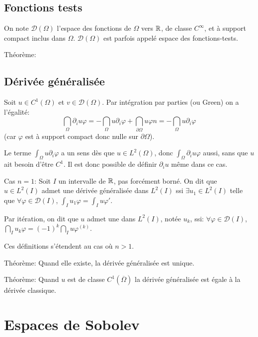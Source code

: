 \medskip
\subsection*{Fonctions tests}

On note $\mathcal{D}(\Omega)$ l'espace des fonctions de $\Omega$ vers $\mathbb R$, de
classe $C^\infty$, et à support compact inclus dans $\Omega$.
$\mathcal{D}(\Omega)$ est parfois appelé espace des fonctions-tests.

Théorème: 

\medskip
\subsection*{Dérivée généralisée}

Soit $u\in C^1(\Omega)$ et $v\in\mathcal{D}(\Omega)$. 
Par intégration par parties (ou Green) on a l'égalité:
\[
\dint_\Omega \partial_iu \varphi = -\dint_\Omega u \partial_i\varphi
+\dint_{\partial\Omega} u\varphi n
= -\dint_\Omega u \partial_i\varphi
\]
(car $\varphi$ est à support compact donc nulle sur $\partial\Omega$).

Le terme $\int_\Omega u \partial_i\varphi$ a un sens dès que $u\in L^2(\Omega)$,
donc $\int_\Omega \partial_iu \varphi$ aussi, sans que $u$ ait besoin d'être $C^1$.
Il est donc possible de définir $\partial_i u$ même dans ce cas.

\medskip
Cas $n=1$: Soit $I$ un intervalle de $\mathbb R$, pas forcément borné. 
On dit que $u\in L^2(I)$ admet une dérivée généralisée dans $L^2(I)$ 
ssi $\exists u_1\in L^2(I)$ telle que $\forall\varphi\in\mathcal{D}(I)$,
$\int_I u_1\varphi = \int_I u\varphi'$.

Par itération, on dit que $u$ admet une  dans $L^2(I)$, notée $u_k$, ssi: $\forall\varphi\in\mathcal{D}(I)$,
$\dint_I u_k\varphi = (-1)^k\dint_I u\varphi^{(k)}$.

Ces définitions s'étendent au cas où $n>1$.

\medskip
Théorème: Quand elle existe, la dérivée généralisée est unique.

Théorème: Quand $u$ est de classe $C^1(\overline{\Omega})$ la dérivée généralisée 
est égale à la dérivée classique.




\medskip
\section*{Espaces de Sobolev}

